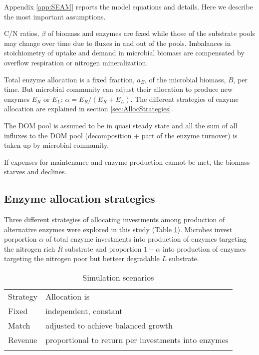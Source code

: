 Appendix \ref{app:SEAM} reports the model equations and details. Here we
describe the most important assumptions.

C/N ratios, $\beta$ of biomass and enzymes are
fixed while those of the substrate pools may change over time due to
fluxes in and out of the pools. Imbalances in stoichiometry of uptake and demand
in microbial biomass are compensated by overflow respiration or nitrogen
mineralization.

Total enzyme allocation is a fixed fraction,
$a_E$, of the microbial biomass, $B$, per time. But microbial community can
adjust their allocation to produce new enzymes $E_R$ or $E_L$: $\alpha = E_R / (E_R + E_L)$. The different strategies
of enzyme allocation are explained in section \ref{sec:AllocStrategies}.

The DOM pool is assumed to be in quasi steady state and all the sum of all
influxes to the DOM pool (decomposition + part of the enzyme turnover) is taken
up by microbial community.

If expenses for maintenance and enzyme production cannot be met, the biomass
starves and declines.
 
\subsection{ Enzyme allocation strategies 
\label{sec:AllocStrategies}}

Three different strategies of allocating investments among production of
alternative enzymes were explored in this study (Table
\ref{tab:AllocStrategies}). Microbes invest porportion $\alpha$ of total enzyme
investments into production of enzymes targeting the nitrogen rich $R$ substrate
and proportion $1 - \alpha$ into production of enzymes targeting the nitrogen
poor but betteer degradable $L$ substrate.

\begin{table}[t]
\caption{Simulation scenarios \label{tab:AllocStrategies}}
\vskip4mm
\centering
\begin{tabular}{ll}
\tophline
Strategy &  Allocation is \\
\middlehline
Fixed & independent, constant \\
Match & adjusted to achieve balanced growth \\
Revenue & proportional to return per investments into enzymes \\
\bottomhline
\end{tabular}
\end{table}


